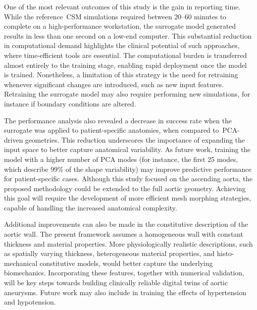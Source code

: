 \documentclass[a4paper,fleqn]{cas-sc}
\begin{document}
One of the most relevant outcomes of this study is the gain in reporting time. While the reference~\gls{CSM} simulations required between 20--60 minutes to complete on a high-performance workstation, the surrogate model generated results in less than one second on a low-end computer. This substantial reduction in computational demand highlights the clinical potential of such approaches, where time-efficient tools are essential. The computational burden is transferred almost entirely to the training stage, enabling rapid deployment once the model is trained. Nonetheless, a limitation of this strategy is the need for retraining whenever significant changes are introduced, such as new input features. Retraining the surrogate model may also require performing new simulations, for instance if boundary conditions are altered.

The performance analysis also revealed a decrease in success rate when the surrogate was applied to patient-specific anatomies, when compared to~\gls{PCA}-driven geometries. This reduction underscores the importance of expanding the input space to better capture anatomical variability. As future work, training the model with a higher number of PCA modes (for instance, the first 25 modes, which describe 99\% of the shape variability) may improve predictive performance for patient-specific cases. Although this study focused on the ascending aorta, the proposed methodology could be extended to the full aortic geometry. Achieving this goal will require the development of more efficient mesh morphing strategies, capable of handling the increased anatomical complexity.

Additional improvements can also be made in the constitutive description of the aortic wall. The present framework assumes a homogeneous wall with constant thickness and material properties. More physiologically realistic descriptions, such as spatially varying thickness, heterogeneous material properties, and histo-mechanical constitutive models, would better capture the underlying biomechanics. Incorporating these features, together with numerical validation, will be key steps towards building clinically reliable digital twins of aortic aneurysms. Future work may also include in training the effects of hypertension and hypotension.

\end{document}
